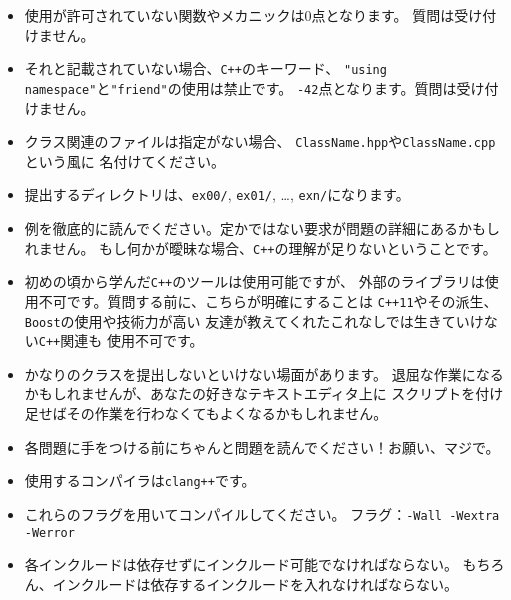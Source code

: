 \begin{itemize}
\begin{itemize}
		  \end{itemize}

		\item 使用が許可されていない関数やメカニックは0点となります。
            質問は受け付けません。

        \item それと記載されていない場合、\texttt{C++}のキーワード、
            \texttt{"using namespace"}と\texttt{"friend"}の使用は禁止です。
            \texttt{-42}点となります。質問は受け付けません。

        \item クラス関連のファイルは指定がない場合、
            \texttt{ClassName.hpp}や\texttt{ClassName.cpp}という風に
            名付けてください。

        \item 提出するディレクトリは、\texttt{ex00/}, \texttt{ex01/},
          \dots, \texttt{exn/}になります。

        \item 例を徹底的に読んでください。定かではない要求が問題の詳細にあるかもしれません。
            もし何かが曖昧な場合、\texttt{C++}の理解が足りないということです。

        \item 初めの頃から学んだ\texttt{C++}のツールは使用可能ですが、
            外部のライブラリは使用不可です。質問する前に、こちらが明確にすることは
            \texttt{C++11}やその派生、\texttt{Boost}の使用や技術力が高い
            友達が教えてくれたこれなしでは生きていけない\texttt{C++}関連も
            使用不可です。

        \item かなりのクラスを提出しないといけない場面があります。
            退屈な作業になるかもしれませんが、あなたの好きなテキストエディタ上に
            スクリプトを付け足せばその作業を行わなくてもよくなるかもしれません。

        \item 各問題に手をつける前にちゃんと問題を読んでください！お願い、マジで。

        \item 使用するコンパイラは\texttt{clang++}です。

        \item これらのフラグを用いてコンパイルしてください。
            フラグ：\texttt{-Wall -Wextra -Werror}

        \item 各インクルードは依存せずにインクルード可能でなければならない。
             もちろん、インクルードは依存するインクルードを入れなければならない。


\end{itemize}
